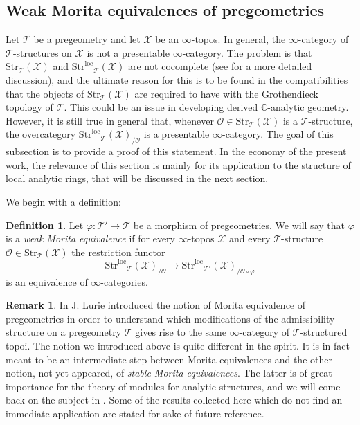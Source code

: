 \documentclass[12pt,a4paper,reqno]{amsart}
\theoremstyle{plain}
\theoremstyle{definition}
\newtheorem{defin}[thm]{Definition}
\newtheorem{rem}[thm]{Remark}
\theoremstyle{remark}
\numberwithin{equation}{section}
\begin{document}
\subsection{Weak Morita equivalences of pregeometries} \label{subsec:weak_Morita}

Let ${\mathcal T}$ be a pregeometry and let ${\mathcal X}$ be an $\infty$-topos.
In general, the $\infty$-category of ${\mathcal T}$-structures on ${\mathcal X}$ is not a presentable $\infty$-category.
The problem is that ${\mathrm{Str}}_{\mathcal T}({\mathcal X})$ and ${\mathrm{Str}^\mathrm{loc}}_{\mathcal T}({\mathcal X})$ are not cocomplete (see \cite[Prop.\ 1.5.1]{DAG-V} for a more detailed discussion), and the ultimate reason for this is to be found in the compatibilities that the objects of ${\mathrm{Str}}_{\mathcal T}({\mathcal X})$ are required to have with the Grothendieck topology of ${\mathcal T}$.
This could be an issue in developing derived {$\mathbb C$-analytic\xspace} geometry.
However, it is still true in general that, whenever ${\mathcal O} \in {\mathrm{Str}}_{\mathcal T}({\mathcal X})$ is a ${\mathcal T}$-structure, the overcategory ${\mathrm{Str}^\mathrm{loc}}_{\mathcal T}({\mathcal X})_{/{\mathcal O}}$ is a presentable $\infty$-category. The goal of this subsection is to provide a proof of this statement.
In the economy of the present work, the relevance of this section is mainly for its application to the structure of local analytic rings, that will be discussed in the next section.

We begin with a definition:

\begin{defin}
	Let $\varphi \colon {\mathcal T}' \to {\mathcal T}$ be a morphism of pregeometries.
	We will say that $\varphi$ is a \emph{weak Morita equivalence} if for every $\infty$-topos ${\mathcal X}$ and every ${\mathcal T}$-structure ${\mathcal O} \in {\mathrm{Str}}_{\mathcal T}({\mathcal X})$ the restriction functor
	\[ {\mathrm{Str}^\mathrm{loc}}_{\mathcal T}({\mathcal X})_{/ {\mathcal O}} \to {\mathrm{Str}^\mathrm{loc}}_{{\mathcal T}'}({\mathcal X})_{/ {\mathcal O} \circ \varphi} \]
	is an equivalence of $\infty$-categories.
\end{defin}

\begin{rem}
	In \cite[Â§3.2]{DAG-V} J. Lurie introduced the notion of Morita equivalence of pregeometries in order to understand which modifications of the admissibility structure on a pregeometry ${\mathcal T}$ gives rise to the same $\infty$-category of ${\mathcal T}$-structured topoi.
	The notion we introduced above is quite different in the spirit.
	It is in fact meant to be an intermediate step between Morita equivalences and the other notion, not yet appeared, of \emph{stable Morita equivalences}.
	The latter is of great importance for the theory of modules for analytic structures, and we will come back on the subject in \cite{Porta_Analytic_deformation_2015}.
	Some of the results collected here which do not find an immediate application are stated for sake of future reference.
\end{rem}
\end{document}
